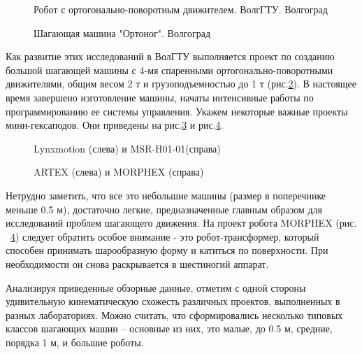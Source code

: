 \begin{figure}[here]
\caption{Робот с ортогонально-поворотным движителем. ВолгГТУ. Волгоград}
\label{fig24}
\end{figure}
\begin{figure}[here]
\caption{Шагающая машина "Ортоног". Волгоград}
\label{fig25}
\end{figure} 

Как развитие этих исследований в ВолГТУ выполняется проект по созданию большой шагающей машины с 4-мя спаренными ортогонально-поворотными движителями, общим весом 2 т и грузоподъемностью до 1 т (рис.\ref{fig25}). В настоящее время завершено изготовление машины, начаты интенсивные работы по программированию ее системы управления. Укажем некоторые важные проекты мини-гексаподов. Они приведены на рис.\ref{fig26} и рис.\ref{fig27}.

\begin{figure}[here]
\begin{minipage}{0.49\linewidth}
\end{minipage}
\hfill
\begin{minipage}{0.49\linewidth}
\end{minipage}
\caption{Lynxmotion (слева) и MSR-H01-01(справа)}
\label{fig26}
\end{figure} 

\begin{figure}[here]
\begin{minipage}{0.49\linewidth}
\end{minipage}
\hfill
\begin{minipage}{0.49\linewidth}
\end{minipage}
\caption{ARTEX (слева) и MORPHEX (справа)}
\label{fig27}
\end{figure}

Нетрудно заметить, что все это небольшие машины (размер в поперечнике меньше 0.5 м), достаточно легкие, предназначенные главным образом для исследований проблем шагающего движения. На проект робота MORPHEX (рис. ~\ref{fig27}) следует обратить особое внимание - это робот-трансформер, который способен принимать шарообразную форму и катиться по поверхности. При необходимости он снова раскрывается в шестиногий аппарат.

Анализируя приведенные обзорные данные, отметим с одной стороны удивительную кинематическую схожесть различных проектов, выполненных в разных лабораториях. Можно считать, что сформировались несколько типовых классов шагающих машин – основные из них, это малые, до 0.5 м, средние, порядка 1 м, и большие роботы.


